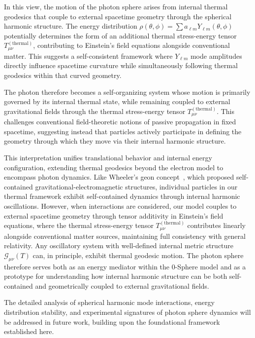 \documentclass[%
 reprint,
 amsmath,amssymb,
 aps,
]{revtex4-1}
\numberwithin{equation}{section}%
\begin{document}
In this view, the motion of the photon sphere arises from internal thermal geodesics that couple to external spacetime geometry through the spherical harmonic structure. The energy distribution $\rho(\theta, \phi) = \sum a_{\ell m} Y_{\ell m}(\theta, \phi)$ potentially determines the form of an additional thermal stress-energy tensor $T_{\mu\nu}^{(\text{thermal})}$, contributing to Einstein's field equations alongside conventional matter. This suggests a self-consistent framework where $Y_{\ell m}$ mode amplitudes directly influence spacetime curvature while simultaneously following thermal geodesics within that curved geometry.

The photon therefore becomes a self-organizing system whose motion is primarily governed by its internal thermal state, while remaining coupled to external gravitational fields through the thermal stress-energy tensor $T_{\mu\nu}^{(\text{thermal})}$. This challenges conventional field-theoretic notions of passive propagation in fixed spacetime, suggesting instead that particles actively participate in defining the geometry through which they move via their internal harmonic structure.

This interpretation unifies translational behavior and internal energy configuration, extending thermal geodesics beyond the electron model to encompass photon dynamics. Like Wheeler's geon concept~\cite{wheeler1955}, which proposed self-contained gravitational-electromagnetic structures, individual particles in our thermal framework exhibit self-contained dynamics through internal harmonic oscillations. However, when interactions are considered, our model couples to external spacetime geometry through tensor additivity in Einstein's field equations, where the thermal stress-energy tensor $T_{\mu\nu}^{(\text{thermal})}$ contributes linearly alongside conventional matter sources, maintaining full consistency with general relativity. Any oscillatory system with well-defined internal metric structure $\mathcal{G}_{\mu\nu}(T)$ can, in principle, exhibit thermal geodesic motion. The photon sphere therefore serves both as an energy mediator within the 0-Sphere model and as a prototype for understanding how internal harmonic structure can be both self-contained and geometrically coupled to external gravitational fields.

The detailed analysis of spherical harmonic mode interactions, energy distribution stability, and experimental signatures of photon sphere dynamics will be addressed in future work, building upon the foundational framework established here.
\end{document}
